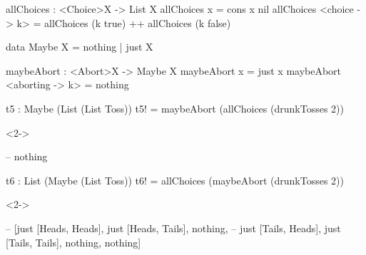 \documentclass{beamer}
\begin{document}
\begin{frame}[fragile]

\begin{frankcode}
allChoices : <Choice>X -> List X
allChoices x             = cons x nil
allChoices <choice -> k> =
  allChoices (k true) ++ allChoices (k false)

data Maybe X = nothing | just X

maybeAbort : <Abort>X -> Maybe X
maybeAbort x               = just x
maybeAbort <aborting -> k> = nothing
\end{frankcode}

\begin{frankcode}
t5 : Maybe (List (List Toss))
t5! = maybeAbort (allChoices (drunkTosses 2))
\end{frankcode}

\begin{visibleenv}<2->
\begin{frankcode}
-- nothing
\end{frankcode}
\end{visibleenv}

\begin{frankcode}
t6 : List (Maybe (List Toss))
t6! = allChoices (maybeAbort (drunkTosses 2))
\end{frankcode}

\begin{visibleenv}<2->
\begin{frankcode}
-- [just [Heads, Heads], just [Heads, Tails], nothing,
--  just [Tails, Heads], just [Tails, Tails], nothing, nothing]
\end{frankcode}
\end{visibleenv}

\end{frame}
\end{document}
